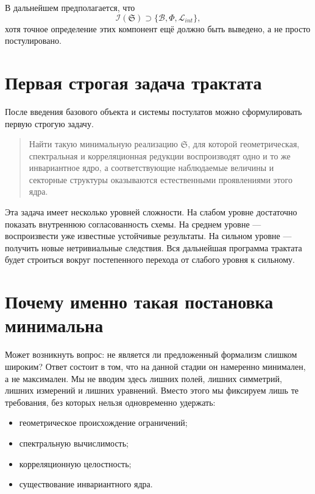 \documentclass[12pt,a4paper]{article}
\begin{document}
В дальнейшем предполагается, что
\begin{equation}
\mathcal{I}(\mathfrak{S}) \supset \{\mathcal{B},\Phi,\mathcal{L}_{int}\},
\end{equation}
хотя точное определение этих компонент ещё должно быть выведено, а не просто постулировано.

\section{Первая строгая задача трактата}

После введения базового объекта и системы постулатов можно сформулировать первую строгую задачу.

\begin{quote}
Найти такую минимальную реализацию \(\mathfrak{S}\), для которой геометрическая, спектральная и корреляционная редукции воспроизводят одно и то же инвариантное ядро, а соответствующие наблюдаемые величины и секторные структуры оказываются естественными проявлениями этого ядра.
\end{quote}

Эта задача имеет несколько уровней сложности. На слабом уровне достаточно показать внутреннюю согласованность схемы. На среднем уровне --- воспроизвести уже известные устойчивые результаты. На сильном уровне --- получить новые нетривиальные следствия. Вся дальнейшая программа трактата будет строиться вокруг постепенного перехода от слабого уровня к сильному.

\section{Почему именно такая постановка минимальна}

Может возникнуть вопрос: не является ли предложенный формализм слишком широким? Ответ состоит в том, что на данной стадии он намеренно минимален, а не максимален. Мы не вводим здесь лишних полей, лишних симметрий, лишних измерений и лишних уравнений. Вместо этого мы фиксируем лишь те требования, без которых нельзя одновременно удержать:
\begin{itemize}
    \item геометрическое происхождение ограничений;
    \item спектральную вычислимость;
    \item корреляционную целостность;
    \item существование инвариантного ядра.
\end{itemize}
\end{document}
